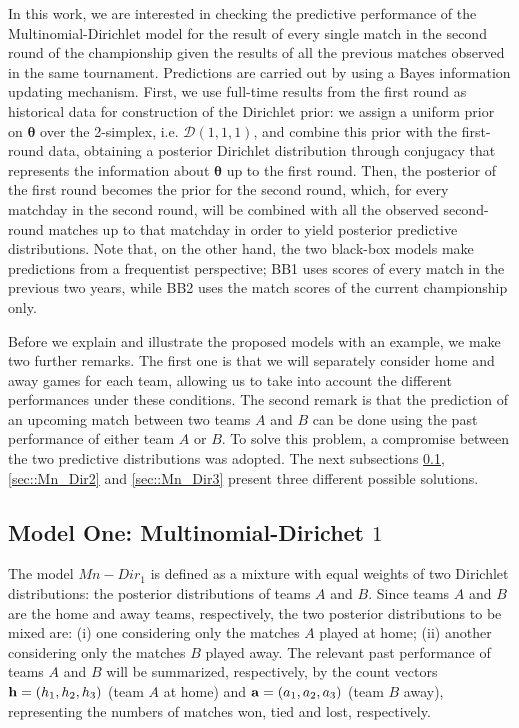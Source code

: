 \documentclass[journal,article,accept,moreauthors,pdftex,12pt,a4paper]{mdpi}
\begin{document}
        {\color{red} In this work, we are interested in checking the predictive performance of the Multinomial-Dirichlet
        model for the result of every single match in the second round of the championship given the results
        of all the previous matches observed in the same tournament. Predictions
        are carried out by using a Bayes information updating mechanism. First, we use full-time
        results from the first round as historical data for construction of the Dirichlet prior: we assign a uniform prior on
        $\boldsymbol{\theta}$ over the 2-simplex, i.e. $\mathcal{D}(1, 1, 1)$, and combine this prior with
        the first-round data, obtaining a posterior Dirichlet distribution through conjugacy that represents
        the information about $\boldsymbol{\theta}$ up to the first round. Then, the posterior of the first
        round becomes the prior for the second round, which, for every matchday in the second round, will be combined with all the observed second-round matches
        up to that matchday in order to yield posterior predictive distributions. Note that, on the other hand, the two
        black-box models make predictions from a frequentist perspective; BB1 uses scores of every match
        in the previous two years, while BB2 uses the match scores of the current championship only.}

        Before we explain and illustrate the proposed models with an example, we make two further remarks.
        The first one is that we will separately consider home and away games for each team, allowing us to take into account the different performances under these conditions.
        The second remark is that the prediction of an upcoming match between two teams $A$ and $B$ can be done using
        the past performance of either team $A$ or $B$.
        To solve this problem, a compromise between the two predictive distributions was adopted.
        The next subsections \ref{sec::Mn_Dir1}, \ref{sec::Mn_Dir2} and \ref{sec::Mn_Dir3} present three different possible solutions.

    \subsection{Model One: Multinomial-Dirichet $1$}
    \label{sec::Mn_Dir1}

    The model $Mn-Dir_1$ is defined as a mixture with equal weights of two Dirichlet distributions: the posterior distributions of teams $A$ and $B$.
    Since teams $A$ and $B$ are the home and away teams, respectively, the two posterior distributions to be mixed are: (i) one considering only the matches $A$ played at home; (ii) another considering only the matches $B$ played away.
    The relevant past performance of teams $A$ and $B$ will be summarized, respectively, by the count vectors ${\bf h} = (h_1, h_2, h_3)$ (team $A$ at home) and ${\bf a} = (a_1, a_2, a_3)$ (team $B$ away), representing the numbers of matches won, tied and lost, respectively.
\end{document}
